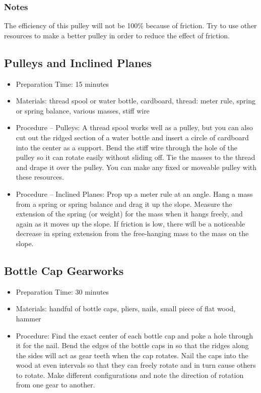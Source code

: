 \subsubsection*{Notes}
The efficiency of this pulley will not be 100\% because of friction.  Try to use other resources to make a better pulley in order to reduce the effect of friction.




\subsection{Pulleys and Inclined Planes}
\begin{itemize}
\item{Preparation Time: 15 minutes}
\item{Materials: thread spool or water bottle, cardboard, thread: meter rule, spring or spring balance, various masses, stiff wire}
\item{Procedure – Pulleys: A thread spool works well as a pulley, but you can also cut out the ridged section of a water bottle and insert a circle of cardboard into the center as a support. Bend the stiff wire through the hole of the pulley so it can rotate easily without sliding off. Tie the masses to the thread and drape it over the pulley. You can make any fixed or moveable pulley with these resources.}
\item{Procedure – Inclined Planes: Prop up a meter rule at an angle. Hang a mass from a spring or spring balance and drag it up the slope. Measure the extension of the spring (or weight) for the mass when it hangs freely, and again as it moves up the slope. If friction is low, there will be a noticeable decrease in spring extension from the free-hanging mass to the mass on the slope.}
\end{itemize}





\subsection{Bottle Cap Gearworks}
\begin{itemize}
\item{Preparation Time: 30 minutes}
\item{Materials: handful of bottle caps, pliers, nails, small piece of flat wood, hammer}
\item{Procedure: Find the exact center of each bottle cap and poke a hole through it for the nail. Bend the edges of the bottle caps in so that the ridges along the sides will act as gear teeth when the cap rotates. Nail the caps into the wood at even intervals so that they can freely rotate and in turn cause others to rotate. Make different configurations and note the direction of rotation from one gear to another.}
\end{itemize}




